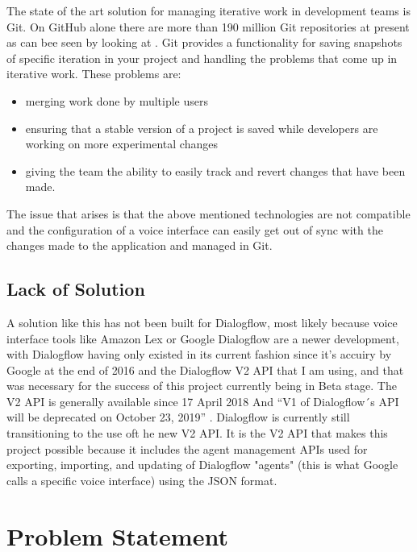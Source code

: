 The state of the art solution for managing iterative work in development teams is Git. On GitHub alone there are more than 190 million Git repositories at present as can bee seen by looking at \cite{Githuba}.
Git provides a functionality for saving snapshots of specific iteration in your project and handling the problems that come up in iterative work.
These problems are:
\begin{itemize}
    \item merging work done by multiple users
    \item ensuring that a stable version of a project is saved while developers are working on more experimental changes
    \item giving the team the ability to easily track and revert changes that have been made.
\end{itemize}
The issue that arises is that the above mentioned technologies are not compatible and the configuration of a voice interface can easily get out of sync with the changes made to the application and managed in Git.

\section{Lack of Solution}
A solution like this has not been built for Dialogflow, most likely because voice interface tools like Amazon Lex or Google Dialogflow are a newer development, with Dialogflow having only existed in its current fashion since it's accuiry by Google at the end of 2016 \cite{Huffman2016} and the Dialogflow V2 API that I am using, and that was necessary for the success of this project currently being in Beta stage. The V2 API is generally available since 17 April 2018 \cite{Imrie-Situnayake2018}
And “V1 of Dialogflow´s API will be deprecated on October 23, 2019” \cite{Dialogflow}.
Dialogflow is currently still transitioning to the use oft he new V2 API.
It is the V2 API that makes this project possible because it includes the agent management APIs used for exporting, importing, and updating of Dialogflow "agents" (this is what Google calls a specific voice interface) using the JSON format.

\chapter{Problem Statement}

